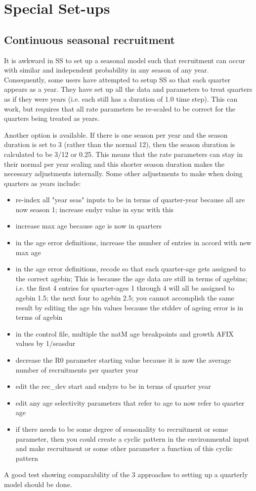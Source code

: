 \section{Special Set-ups}

\subsection{Continuous seasonal recruitment}
It is awkward in SS to set up a seasonal model such that recruitment can occur with similar and independent probability in any season of any year.  Consequently, some users have attempted to setup SS so that each quarter appears as a year.  They have set up all the data and parameters to treat quarters as if they were years (i.e. each still has a duration of 1.0 time step).  This can work, but requires that all rate parameters be re-scaled to be correct for the quarters being treated as years.

Another option is available.  If there is one season per year and the season duration is set to 3 (rather than the normal 12), then the season duration is calculated to be 3/12 or 0.25.  This means that the rate parameters can stay in their normal per year scaling and this shorter season duration makes the necessary adjustments internally.  Some other adjustments to make when doing quarters as years include:

\begin{itemize}
	\item re-index all "year seas" inputs to be in terms of quarter-year because all are now season 1; increase endyr value in sync with this
	\item increase max age because age is now in quarters
	\item in the age error definitions, increase the number of entries in accord with new max age
	\item in the age error definitions, recode so that each quarter-age gets assigned to the correct agebin;  This is because the age data are still in terms of agebins; i.e. the first 4 entries for quarter-ages 1 through 4 will all be assigned to agebin 1.5; the next four to agebin 2.5;  you cannot accomplish the same result by editing the age bin values because the stddev of ageing error is in terms of agebin
	\item in the control file, multiple the natM age breakpoints  and growth AFIX values by 1/seasdur
	\item decrease the R0 parameter starting value because it is now the average number of recruitments per quarter year
	\item edit the rec\_dev start and endyrs to be in terms of quarter year
	\item edit any age selectivity parameters that refer to age to now refer to quarter age
	\item if there needs to be some degree of seasonality to recruitment or some parameter, then you could create a cyclic pattern in the environmental input and make recruitment or some other parameter a function of this cyclic pattern
\end{itemize}
	
A good test showing comparability of the 3 approaches to setting up a quarterly model should be done.

